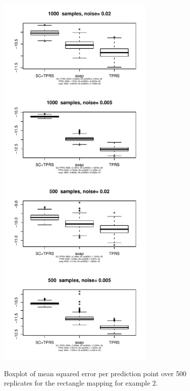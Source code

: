 \documentclass[a4paper,10pt]{amsart}
\begin{document}
\begin{figure}[p]
\centering
\includegraphics[width=3in]{figs-otherdomains/wigglytop-boxplot.pdf} \\
\caption{Boxplot of mean squared error per prediction point over 500 replicates for the rectangle mapping for example 2. }
\label{wigglytop-boxplots}
\end{figure}
\end{document}
